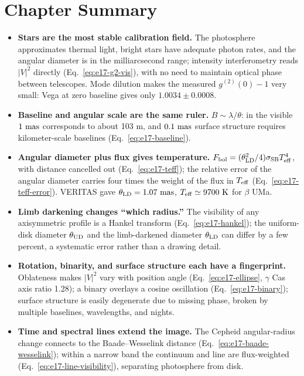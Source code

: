 \section{Chapter Summary}
\label{sec:e17-summary}

\begin{itemize}
  \item \textbf{Stars are the most stable calibration field.} The photosphere approximates thermal light, bright stars have adequate photon rates, and the angular diameter is in the milliarcsecond range; intensity interferometry reads \(|V|^2\) directly (Eq.~\eqref{eq:e17-g2-vis}), with no need to maintain optical phase between telescopes. Mode dilution makes the measured \(g^{(2)}(0)-1\) very small: Vega at zero baseline gives only \(1.0034\pm0.0008\).
  \item \textbf{Baseline and angular scale are the same ruler.} \(B\sim\lambda/\theta\): in the visible \(1~{\rm mas}\) corresponds to about 103 m, and \(0.1~{\rm mas}\) surface structure requires kilometer-scale baselines (Eq.~\eqref{eq:e17-baseline}).
  \item \textbf{Angular diameter plus flux gives temperature.} \(F_{\rm bol}=(\theta_{\rm LD}^2/4)\sigma_{\rm SB}T_{\rm eff}^4\), with distance cancelled out (Eq.~\eqref{eq:e17-teff}); the relative error of the angular diameter carries four times the weight of the flux in \(T_{\rm eff}\) (Eq.~\eqref{eq:e17-teff-error}). VERITAS gave \(\theta_{\rm LD}=1.07~{\rm mas}\), \(T_{\rm eff}\simeq9700~{\rm K}\) for \(\beta\) UMa.
  \item \textbf{Limb darkening changes ``which radius.''} The visibility of any axisymmetric profile is a Hankel transform (Eq.~\eqref{eq:e17-hankel}); the uniform-disk diameter \(\theta_{\rm UD}\) and the limb-darkened diameter \(\theta_{\rm LD}\) can differ by a few percent, a systematic error rather than a drawing detail.
  \item \textbf{Rotation, binarity, and surface structure each have a fingerprint.} Oblateness makes \(|V|^2\) vary with position angle (Eq.~\eqref{eq:e17-ellipse}, \(\gamma\) Cas axis ratio 1.28); a binary overlays a cosine oscillation (Eq.~\eqref{eq:e17-binary}); surface structure is easily degenerate due to missing phase, broken by multiple baselines, wavelengths, and nights.
  \item \textbf{Time and spectral lines extend the image.} The Cepheid angular-radius change connects to the Baade--Wesselink distance (Eq.~\eqref{eq:e17-baade-wesselink}); within a narrow band the continuum and line are flux-weighted (Eq.~\eqref{eq:e17-line-visibility}), separating photosphere from disk.
\end{itemize}

